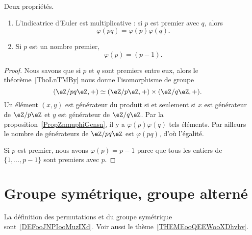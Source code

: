 \begin{corollary}       \label{CorlvTmsf}
	Deux propriétés.
	\begin{enumerate}
		\item
		      L'indicatrice d'Euler est multiplicative : si \( p\) est premier avec \( q\), alors
		      \begin{equation}
			      \varphi(pq)=\varphi(p)\varphi(q).
		      \end{equation}
		\item
		      Si \( p\) est un nombre premier,
		      \begin{equation}
			      \varphi(p)=(p-1).
		      \end{equation}
	\end{enumerate}
\end{corollary}

\begin{proof}
	Nous savons que si \( p\) et \( q\) sont premiers entre eux, alors le théorème~\ref{ThoLnTMBy} nous donne l'isomorphisme de groupe
	\begin{equation}
		(\eZ/pq\eZ,+)\simeq(\eZ/p\eZ,+)\times(\eZ/q\eZ,+).
	\end{equation}
	Un élément \( (x,y)\) est générateur du produit si et seulement si \( x\) est générateur de \( \eZ/p\eZ\) et \( y\) est générateur de \( \eZ/q\eZ\). Par la proposition~\ref{PropZnmuphiGensn}, il y a \( \varphi(p)\varphi(q)\) tels éléments. Par ailleurs le nombre de générateurs de \( \eZ/pq\eZ\) est \( \varphi(pq)\), d'où l'égalité.

	Si \( p\) est premier, nous avons \( \varphi(p)=p-1\) parce que tous les entiers de \( \{ 1,\ldots, p-1 \}\) sont premiers avec \( p\).
\end{proof}


\section{Groupe symétrique, groupe alterné}
\label{SECooZFYQooFfopMa}

La définition des permutations et du groupe symétrique sont~\ref{DEFooJNPIooMuzIXd}. Voir aussi le thème~\ref{THEMEooQEEWooXDhvhv}.

